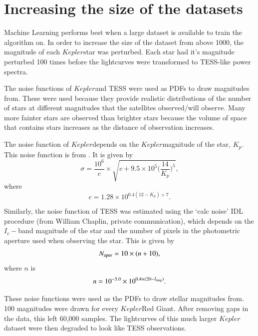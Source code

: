 \documentclass[a4paper,fleqn,usenatbib,useAMS]{mnras}
\newcommand{\kep}{\ensuremath{Kepler}\:}
\begin{document}
\section{Increasing the size of the datasets}
\label{sect: size}

Machine Learning performs best when a large dataset is available to train the algorithm on. In order to increase the size of the dataset from \citet{davies_asteroseismology_2016} above 1000, the magnitude of each \kep star was perturbed. Each star had it's magnitude perturbed 100 times before the lightcurves were transformed to TESS-like power spectra. 

The noise functions of \kep and TESS were used as PDFs to draw magnitudes from. These were used because they provide realistic distributions of the number of stars at different magnitudes that the satellites observed/will observe. Many more fainter stars are observed than brighter stars because the volume of space that contains stars increases as the distance of observation increases.

The noise function of \kep depends on the \kep magnitude of the star, $K_{p}$. This noise function is from \citet{chaplin_predicting_2011}. It is given by
\begin{equation}
\sigma = \frac{10^{6}}{c} \times \sqrt{c+9.5 \times 10^{5}\Bigg(\frac{14}{K_{p}}\Bigg)^{5}} ,
\label{eq:kep noise}
\end{equation}
where
\begin{equation}
c = 1.28 \times 10^{0.4(12-K_{p})+7} .
\end{equation}

Similarly, the noise function of TESS was estimated using the `calc noise' IDL procedure (from William Chaplin, private communication), which depends on the $I_{c}-$band magnitude of the star and the number of pixels in the photometric aperture used when observing the star. This is given by
\begin{equation}
N_{\rm aper} = 10 \times (n+10) , 
\end{equation}
where $n$ is
\begin{equation}
\label{eq:tess noise}
n = 10^{-5.0} \times 10^{ 0.4 \times (20-I_{\rm mag})} .
\end{equation}

These noise functions were used as the PDFs to draw stellar magnitudes from. 100 magnitudes were drawn for every \kep Red Giant. After removing gaps in the data, this left 60,000 samples. The lightcurves of this much larger \kep dataset were then degraded to look like TESS observations.
\end{document}
